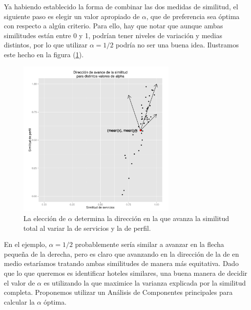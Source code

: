 \documentclass[12pt]{report}
\begin{document}
Ya habiendo establecido la forma de combinar las dos medidas de similitud, el siguiente paso es elegir un valor apropiado de $\alpha$, que de preferencia sea óptima con respecto a algún criterio. Para ello, hay que notar que aunque ambas similitudes están entre 0 y 1, podrían tener niveles de variación y medias distintos, por lo que utilizar $\alpha = 1/2$ podría no ser una buena idea. Ilustramos este hecho en la figura (\ref{alpha}).
\begin{figure}[ht]
	\centering
	\includegraphics[width=0.7\textwidth]{imagenes/alpha.pdf}
	\caption{\label{alpha} La elección de $\alpha$ determina la dirección en la que avanza la similitud total al variar la de servicios y la de perfil.}
\end{figure}
En el ejemplo, $\alpha = 1/2$ probablemente sería similar a avanzar en la flecha pequeña de la derecha, pero es claro que avanzando en la dirección de la de en medio estaríamos tratando ambas similitudes de manera más equitativa. Dado que lo que queremos es identificar hoteles similares, una buena manera de decidir el valor de $\alpha$ es utilizando la que maximice la varianza explicada por la similitud completa. Proponemos utilizar un Análisis de Componentes principales para calcular la $\alpha$ óptima.
\end{document}
